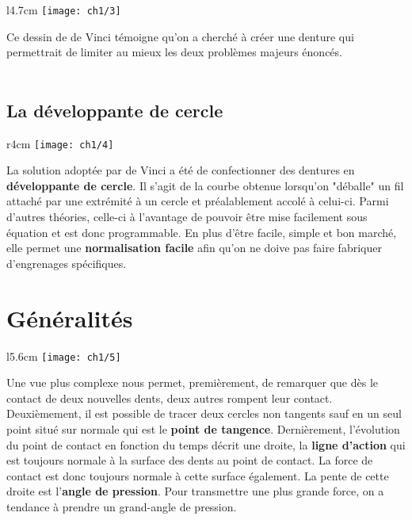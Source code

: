 	\begin{wrapfigure}[4]{l}{4.7cm}
	\vspace{-5mm}
	\texttt{[image: ch1/3]}
	\end{wrapfigure}	
	\noindent Ce dessin de de Vinci témoigne qu'on a cherché à créer une denture qui permettrait de limiter au mieux les deux problèmes majeurs énoncés. \\\\
	
\subsection{La développante de cercle}
\label{subsec:1.2.2}
	\begin{wrapfigure}[9]{r}{4cm}
	\vspace{-5mm}
	\texttt{[image: ch1/4]}
	\end{wrapfigure}	
	\noindent La solution adoptée par de Vinci a été de confectionner des dentures en \textbf{développante de cercle}. Il s'agit de la courbe obtenue lorsqu'on "déballe" un fil attaché par une extrémité à un cercle et préalablement accolé à celui-ci. Parmi d'autres théories, celle-ci à l'avantage de pouvoir être mise facilement sous équation et est donc programmable. En plus d'être facile, simple et bon marché, elle permet une \textbf{normalisation facile} afin qu'on ne doive pas faire fabriquer d'engrenages spécifiques. 
	
\section{Généralités}
	\begin{wrapfigure}[8]{l}{5.6cm}
	\vspace{-5mm}
	\texttt{[image: ch1/5]}
	\end{wrapfigure}	
	\noindent Une vue plus complexe nous permet, premièrement, de remarquer que dès le contact de deux nouvelles dents, deux autres rompent leur contact. Deuxièmement, il est possible de tracer deux cercles non tangents sauf en un seul point situé sur normale qui est le \textbf{point de tangence}. Dernièrement, l'évolution du point de contact en fonction du temps décrit une droite, la \textbf{ligne d'action} qui est toujours normale à la surface des dents au point de contact. La force de contact est donc toujours normale à cette surface également. La pente de cette droite est l'\textbf{angle de pression}. Pour transmettre une plus grande force, on a tendance à prendre un grand-angle de pression. \\
	
